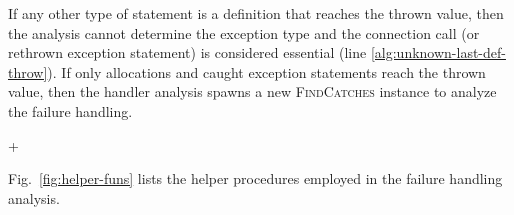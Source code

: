 If any other type of statement is a definition that reaches the thrown
value, then the analysis cannot determine the exception type and the
connection call (or rethrown exception statement) is considered
essential (line \ref{alg:unknown-last-def-throw}).  If only
allocations and caught exception statements reach the thrown value,
then the handler analysis spawns a new \textsc{FindCatches} instance
to analyze the failure handling. 












\lstDeleteShortInline+


Fig.~\ref{fig:helper-funs} lists the helper procedures employed in
the failure handling analysis.

